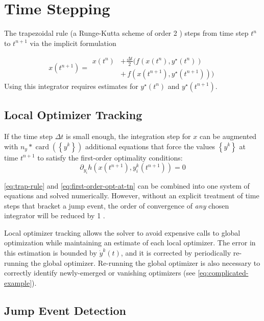 \documentclass[twoside,leqno, twocolumn]{article}
\DeclareMathOperator{\card}{\mathrm{card}}
\begin{document}
\section{Time Stepping}
The trapezoidal rule (a Runge-Kutta scheme of order 2 \cite{butcherNumericalMethodsOrdinary2008}) steps from time step $t^n$ to $t^{n+1}$ via the implicit formulation

\begin{equation}
	\label{eq:trap-rule}
	x(t^{n+1}) = \begin{aligned}x(t^n) &+ \frac{\Delta t}{2}(f(x(t^n), y^\star(t^n))\\&+\, f(x(t^{n+1}), y^\star(t^{n+1})))\end{aligned}
\end{equation}
Using this integrator requires estimates for $y^\star(t^{n})$ and $y^\star(t^{n+1})$.

\subsection{Local Optimizer Tracking}
If the time step $\Delta t$ is small enough, the integration step for $x$ can be augmented with $n_y * \card\left(\left\{y^k\right\}\right)$ additional equations that force the values $\left\{y^k\right\}$ at time $t^{n+1}$ to satisfy the first-order optimality conditions:
\begin{equation}
	\label{eq:first-order-opt-at-tn}
	\partial_{y_i}h\left(x(t^{n+1}), y^k_i(t^{n+1})\right) = 0
\end{equation}
	
\eqref{eq:trap-rule} and \eqref{eq:first-order-opt-at-tn} can be combined into one system of equations and solved numerically. However, without an explicit treatment of time steps that bracket a jump event, the order of convergence of \textit{any} chosen integrator will be reduced by 1 \cite{mannshardtOnestepMethodsAny1978}.

Local optimizer tracking allows the solver to avoid expensive calls to global optimization while maintaining an estimate of each local optimizer. The error in this estimation is bounded by $\dot y^k(t)$, and it is corrected by periodically re-running the global optimizer. Re-running the global optimizer is also necessary to correctly identify newly-emerged or vanishing optimizers (see \eqref{eq:complicated-example}).  

\subsection{Jump Event Detection}
\end{document}
